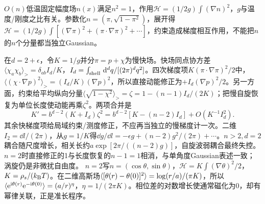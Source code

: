 \label{ch:bkt}
$O(n)$低温固定幅度场$n(x)$满足$n^2=1$，作用$\mathcal H=(1/2g)\int(\nabla n)^2$，$g$与温度/刚度之比有关。参数化$n=(\pi,\sqrt{1-\pi^2})$，展开得$\mathcal H=(1/2g)\int[(\nabla\pi)^2+(\pi\cdot\nabla\pi)^2+\cdots]$，约束造成梯度相互作用，不能把$n$的$n$个分量都当独立Gaussian。

在$d=2+\epsilon$，令$K=1/g$并分$\pi=p+\chi$为慢快场。快场同点协方差$\langle\chi_a\chi_b\rangle_>=\delta_{ab}I_d/K$，$I_d=\int_{\rm shell}\,\mathrm d^dq/[(2\pi)^dq^2]$。四次梯度项$K(\pi\cdot\nabla\pi)^2/2$中，$\langle(\chi\cdot\nabla p)^2\rangle_>=(I_d/K)(\nabla p)^2$，所以直接动能修正为$+I_d(\nabla p)^2/2$。另一方面，约束给平均纵向分量$\langle\sqrt{1-\chi^2}\rangle_>=\zeta=1-(n-1)I_d/(2K)$；把慢自旋恢复为单位长度使动能再乘$\zeta^2$。两项合并是
\begin{equation}
K'=b^{d-2}(K+I_d)\zeta^2
=b^{d-2}[K-(n-2)I_d]+O(K^{-1}I_d^2).
\end{equation}
其余快梯度项给局域约束/测度修正，不应再当独立的慢梯度计一次。二维$I_2=\dd l/(2\pi)$，从$g=1/K$得$\dd g/\dd l=-\epsilon g+(n-2)g^2/(2\pi)+\cdots$。$n>2,d=2$耦合随尺度增长，相关长约$a\exp[2\pi/((n-2)g)]$，自旋波弱耦合最终失控。$n=2$时直接修正的1与长度恢复的$n-1=1$相消，与单角度Gaussian表述一致；涡旋仍是非微扰自由度。
$n=2$写$n=(\cos\theta,\sin\theta)$，$\mathcal H=K\int(\nabla\theta)^2/2$，$K=\rho_s/(k_{\mathrm B} T)$。在二维高斯场$\langle [\theta(r)-\theta(0)]^2\rangle=\log(r/a)/(\pi K)$，所以$\langle \mathrm e^{\mathrm i\theta(r)}\mathrm e^{-\mathrm i\theta(0)}\rangle=(a/r)^{\eta}$，$\eta=1/(2\pi K)$。相位差的对数增长使通常磁化为0，却有幂律关联，正是准长程序。

